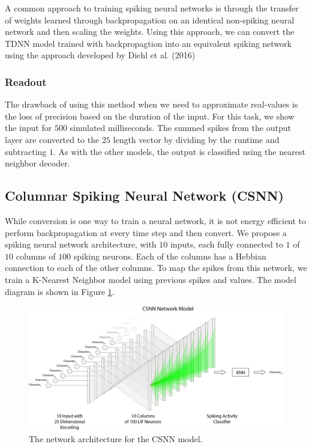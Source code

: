 \documentclass{article}
\begin{document}
A common approach to training spiking neural networks \cite{diehl2015fast} is through the transfer of weights learned through backpropagation on an identical non-spiking neural network and then scaling the weights. Using this approach, we can convert the TDNN model trained with backpropagtion into an equivalent spiking network using the approach developed by Diehl et al. (2016)

\subsubsection*{Readout}

The drawback of using this method when we need to approximate real-values is the loss of precision based on the duration of the input. For this task, we show the input for $500$ simulated milliseconds. The summed spikes from the output layer are converted to the $25$ length vector by dividing by the runtime and subtracting $1$. As with the other models, the output is classified using the nearest neighbor decoder.



\subsection*{Columnar Spiking Neural Network (CSNN)}

While conversion is one way to train a neural network, it is not energy efficient to perform backpropagation at every time step and then convert. We propose a spiking neural network architecture, with $10$ inputs, each fully connected to $1$ of $10$ columns of $100$ spiking neurons. Each of the columns has a Hebbian connection to each of the other columns. To map the spikes from this network, we train a  K-Nearest Neighbor model using previous spikes and values. \cite{beliaev2007time} The model diagram is shown in Figure \ref{fig:csnn-network-diagram}.

\begin{figure}[!h]
    \centering
    \includegraphics[width=\linewidth]{../diagrams/csnn.png}
    \caption{The network architecture for the CSNN model.}
    \label{fig:csnn-network-diagram}
\end{figure}
\end{document}
